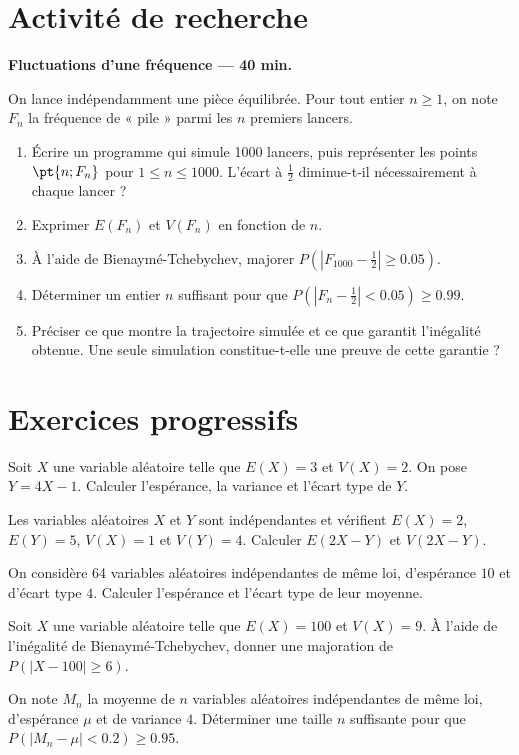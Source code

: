 \section{Activité de recherche}\textbf{Fluctuations d'une fréquence --- 40 min.}\par On lance indépendamment une pièce équilibrée. Pour tout entier $n\ge1$, on note $F_n$ la fréquence de « pile » parmi les $n$ premiers lancers.
\begin{enumerate}\item Écrire un programme qui simule 1000 lancers, puis représenter les points $\pt{n;F_n}$ pour $1\le n\le1000$. L'écart à $\frac12$ diminue-t-il nécessairement à chaque lancer ?
\item Exprimer $E(F_n)$ et $V(F_n)$ en fonction de $n$.
\item À l'aide de Bienaymé-Tchebychev, majorer $P(|F_{1000}-\frac12|\ge\num{0,05})$.
\item Déterminer un entier $n$ suffisant pour que $P(|F_n-\frac12|<\num{0,05})\ge\num{0,99}$.
\item Préciser ce que montre la trajectoire simulée et ce que garantit l'inégalité obtenue. Une seule simulation constitue-t-elle une preuve de cette garantie ?\end{enumerate}

\mxnewpage
\section{Exercices progressifs}

Soit $X$ une variable aléatoire telle que $E(X)=3$ et $V(X)=2$. On pose $Y=4X-1$. Calculer l'espérance, la variance et l'écart type de $Y$.

Les variables aléatoires $X$ et $Y$ sont indépendantes et vérifient $E(X)=2$, $E(Y)=5$, $V(X)=1$ et $V(Y)=4$. Calculer $E(2X-Y)$ et $V(2X-Y)$.

On considère 64 variables aléatoires indépendantes de même loi, d'espérance $10$ et d'écart type $4$. Calculer l'espérance et l'écart type de leur moyenne.

Soit $X$ une variable aléatoire telle que $E(X)=100$ et $V(X)=9$. À l'aide de l'inégalité de Bienaymé-Tchebychev, donner une majoration de $P(|X-100|\ge6)$.

On note $M_n$ la moyenne de $n$ variables aléatoires indépendantes de même loi, d'espérance $\mu$ et de variance $4$. Déterminer une taille $n$ suffisante pour que $P(|M_n-\mu|<\num{0,2})\ge\num{0,95}$.

